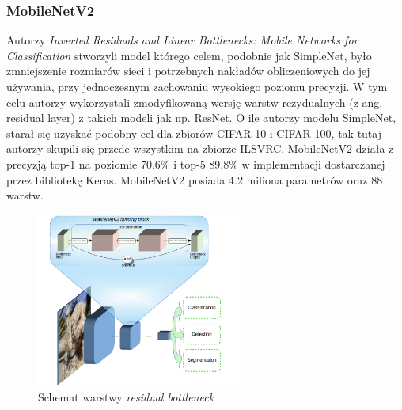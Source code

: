 \documentclass[
    left=2.5cm,         %
    right=2.5cm,        %
    top=2.5cm,          %
    bottom=3cm,         %
    bindingoffset=6mm,  %
    nohyphenation=false %
]{eiti/eiti-thesis}
\begin{document}
        \subsubsection{MobileNetV2}\label{MobileNetV2}
            Autorzy \textit{Inverted Residuals and Linear Bottlenecks: Mobile Networks for Classification}\cite{DBLP:journals/corr/abs-1801-04381}
            stworzyli model którego celem, podobnie jak SimpleNet, było zmniejszenie rozmiarów sieci i potrzebnych nakładów obliczeniowych
            do jej używania, przy jednoczesnym zachowaniu wysokiego poziomu precyzji. W tym celu autorzy wykorzystali
            zmodyfikowaną wersję warstw rezydualnych (z ang. residual layer) z takich modeli jak np. ResNet\cite{DBLP:journals/corr/HeZR016}.
            O ile autorzy modelu SimpleNet, starał się uzyskać
            podobny cel dla zbiorów CIFAR-10 i CIFAR-100, tak tutaj autorzy skupili się przede wszystkim na zbiorze ILSVRC.
            MobileNetV2 działa z precyzją top-1 na poziomie 70.6\% i top-5 89.8\% w implementacji dostarczanej przez bibliotekę Keras.
            MobileNetV2 posiada 4.2 miliona parametrów oraz 88 warstw.

            \begin{figure}[H]
            \begin{center}
            \caption{Schemat warstwy \textit{residual bottleneck}}
            \includegraphics[width=0.6\textwidth]{eiti/mobilenetv2_overview.png}
            \end{center}
            \end{figure}
\end{document}
